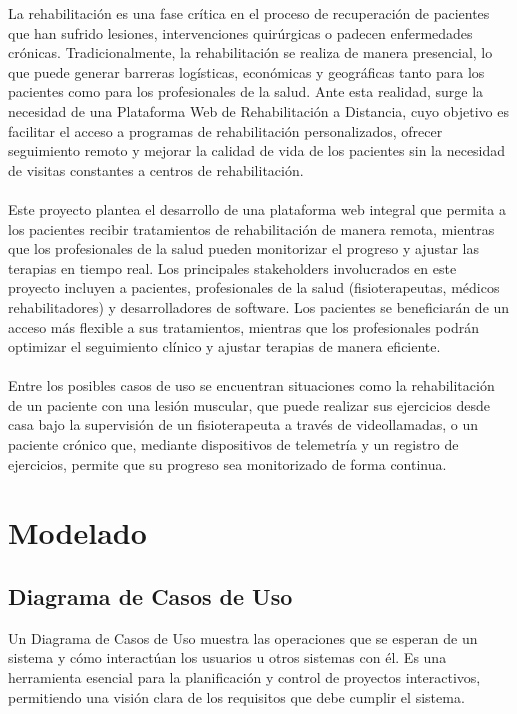 \documentclass{article}
\begin{document}
La rehabilitación es una fase crítica en el proceso de recuperación de pacientes que han sufrido lesiones, intervenciones quirúrgicas o padecen enfermedades crónicas. Tradicionalmente, la rehabilitación se realiza de manera presencial, lo que puede generar barreras logísticas, económicas y geográficas tanto para los pacientes como para los profesionales de la salud. Ante esta realidad, surge la necesidad de una Plataforma Web de Rehabilitación a Distancia, cuyo objetivo es facilitar el acceso a programas de rehabilitación personalizados, ofrecer seguimiento remoto y mejorar la calidad de vida de los pacientes sin la necesidad de visitas constantes a centros de rehabilitación.
\\
\\
Este proyecto plantea el desarrollo de una plataforma web integral que permita a los pacientes recibir tratamientos de rehabilitación de manera remota, mientras que los profesionales de la salud pueden monitorizar el progreso y ajustar las terapias en tiempo real. Los principales stakeholders involucrados en este proyecto incluyen a pacientes, profesionales de la salud (fisioterapeutas, médicos rehabilitadores) y desarrolladores de software. Los pacientes se beneficiarán de un acceso más flexible a sus tratamientos, mientras que los profesionales podrán optimizar el seguimiento clínico y ajustar terapias de manera eficiente.
\\
\\
Entre los posibles casos de uso se encuentran situaciones como la rehabilitación de un paciente con una lesión muscular, que puede realizar sus ejercicios desde casa bajo la supervisión de un fisioterapeuta a través de videollamadas, o un paciente crónico que, mediante dispositivos de telemetría y un registro de ejercicios, permite que su progreso sea monitorizado de forma continua.


\section{Modelado}



\subsection{Diagrama de Casos de Uso}

Un Diagrama de Casos de Uso muestra las operaciones que se esperan de un sistema y cómo interactúan los usuarios u otros sistemas con él. Es una herramienta esencial para la planificación y control de proyectos interactivos, permitiendo una visión clara de los requisitos que debe cumplir el sistema.
\end{document}

